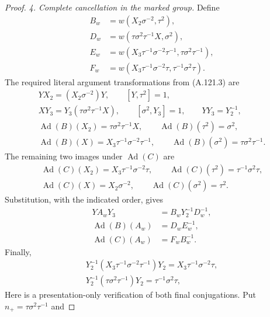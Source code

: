 \begin{proof}
\emph{4. Complete cancellation in the marked group.}
Define
\[
 \begin{aligned}
 B_w&=w(X_2\sigma^{-2},\tau^2),\\
 D_w&=w(\tau\sigma^2\tau^{-1}X,\sigma^2),\\
 E_w&=w(X_3\tau^{-1}\sigma^{-2}\tau^{-1},
                                     \tau\sigma^2\tau^{-1}),\\
 F_w&=w(X_3\tau^{-1}\sigma^{-2}\tau,
                                     \tau^{-1}\sigma^2\tau).
 \end{aligned}                                                \tag{A.121.8}
\]
The required literal argument transformations from (A.121.3) are
\[
 \begin{gathered}
 YX_2=(X_2\sigma^{-2})Y,\qquad [Y,\tau^2]=1,\\
 XY_3=Y_3(\tau\sigma^2\tau^{-1}X),\qquad
 [\sigma^2,Y_3]=1,\qquad YY_3=Y_2^{-1},\\
 \operatorname{Ad}(B)(X_2)=\tau\sigma^2\tau^{-1}X,\qquad
 \operatorname{Ad}(B)(\tau^2)=\sigma^2,\\
 \operatorname{Ad}(B)(X)=X_3\tau^{-1}\sigma^{-2}\tau^{-1},\qquad
 \operatorname{Ad}(B)(\sigma^2)=\tau\sigma^2\tau^{-1}.
 \end{gathered}                                                \tag{A.121.9}
\]
The remaining two images under \(\operatorname{Ad}(C)\) are
\[
 \begin{gathered}
 \operatorname{Ad}(C)(X_2)=X_3\tau^{-1}\sigma^{-2}\tau,\qquad
 \operatorname{Ad}(C)(\tau^2)=\tau^{-1}\sigma^2\tau,\\
 \operatorname{Ad}(C)(X)=X_2\sigma^{-2},\qquad
 \operatorname{Ad}(C)(\sigma^2)=\tau^2 .
 \end{gathered}
\]
Substitution, with the indicated order, gives
\[
 \begin{aligned}
 YA_wY_3&=B_wY_2^{-1}D_w^{-1},\\
 \operatorname{Ad}(B)(A_w)&=D_wE_w^{-1},\\
 \operatorname{Ad}(C)(A_w)&=F_wB_w^{-1}.
 \end{aligned}                                                \tag{A.121.10}
\]
Finally,
\[
 \begin{gathered}
 Y_2^{-1}(X_3\tau^{-1}\sigma^{-2}\tau^{-1})Y_2
              =X_3\tau^{-1}\sigma^{-2}\tau,\\
 Y_2^{-1}(\tau\sigma^2\tau^{-1})Y_2=\tau^{-1}\sigma^2\tau,
 \end{gathered}
\]
Here is a presentation-only verification of both final conjugations.
Put \(n_+=\tau\sigma^2\tau^{-1}\) and

\end{proof}
